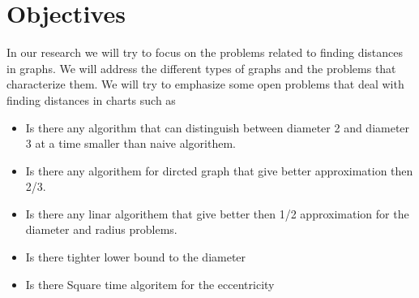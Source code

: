 \section{Objectives }

In our research we will try to focus on the problems related to finding distances in graphs. We will address the different types of graphs and the problems that characterize them.
We will try to emphasize some open problems that deal with finding distances in charts such as
\begin{itemize}
    \item Is there any algorithm that can distinguish between diameter 2 and diameter 3 at a time smaller than naive algorithem.
    \item Is there any algorithem for dircted graph that give better approximation then 2/3.
    \item Is there any linar algorithem that give better then 1/2 approximation for the diameter and radius problems.
    \item Is there tighter lower bound to the diameter
    \item Is there Square time algoritem for the eccentricity
\end{itemize}
